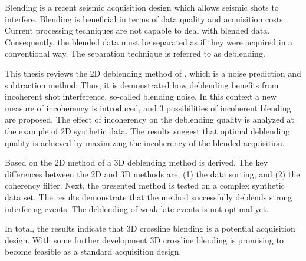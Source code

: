 \documentclass[a4paper,11pt]{mscThesis}
\begin{document}
%
\frontmatter %
%
    \maketitle
%
Blending is a recent seismic acquisition design which allows seismic shots to interfere. Blending is beneficial in terms of data quality and acquisition costs. Current processing techniques are not capable to deal with blended data. Consequently, the blended data must be separated as if they were acquired in a conventional way. The separation technique is referred to as deblending.

This thesis reviews the 2D deblending method of \citet{Mahdad-Deblending-Method}, which is a noise prediction and subtraction method. Thus, it is demonstrated how deblending benefits from incoherent shot interference, so-called blending noise. In this context a new measure of incoherency is introduced, and 3 possibilities of incoherent blending are proposed. The effect of incoherency on the deblending quality is analyzed at the example of 2D synthetic data. The results suggest that optimal deblending quality is achieved by maximizing the incoherency of the blended acquisition.

Based on the 2D method of \citet{Mahdad-Deblending-Method} a 3D deblending method is derived. The key differences between the 2D and 3D methods are; (1) the data sorting, and (2) the coherency filter. Next, the presented method is tested on a complex synthetic data set. The results demonstrate that the method successfully deblends strong interfering events. The deblending of weak late events is not optimal yet. 

In total, the results indicate that 3D crossline blending is a potential acquisition design. With some further development 3D crossline blending is promising to become feasible as a standard acquisition design.
 

   
    \cleardoublepage
%
\toc
%

\begin{comment}
	

    \nonumchap{Acronyms} %
    \begin{acronym}%
        \acro{DUT}{Delft University of Technology}%
    \end{acronym}%
    \cleardublepage%
\end{comment}
\end{document}
